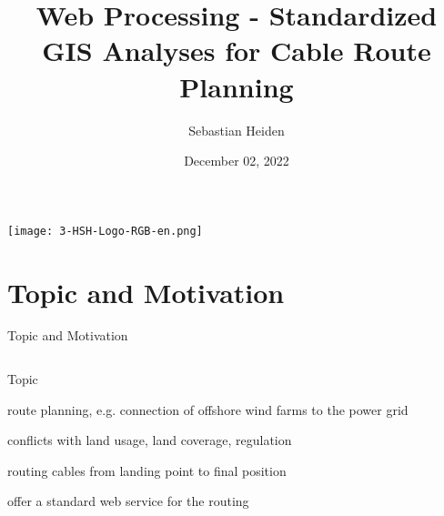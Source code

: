 \documentclass[usenames,dvipsnames,aspectratio=169]{beamer}
\title{Web Processing - Standardized GIS Analyses for Cable Route Planning}
\author{Sebastian Heiden}
\institute{Harz University of Applied Sciences}
\date{December 02, 2022}
\begin{document}
    

\begin{frame}[plain]
	\texttt{[image: 3-HSH-Logo-RGB-en.png]}
    \maketitle
\end{frame}

\section{Topic and Motivation}
\begin{frame}{Topic and Motivation}
\begin{columns}[T] %
\begin{column}{.68\textwidth}
	Topic
	\begin{itemize}
		\item route planning, e.g. connection of offshore wind farms to the power grid
		{\item \color{gray} conflicts with land usage, land coverage, regulation}
		\item routing cables from landing point to final position
		\item offer a standard web service for the routing
	\end{itemize}
	\vspace{0.5cm}
	

\end{column}
\end{columns}
\end{frame}
\end{document}
